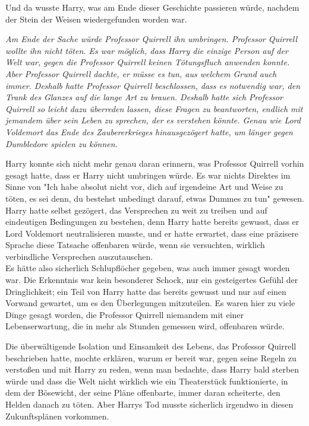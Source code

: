 {Und da wusste Harry, was am Ende dieser Geschichte passieren würde, nachdem der Stein der Weisen wiedergefunden worden war.

\emph{Am Ende der Sache würde Professor Quirrell ihn umbringen. Professor Quirrell wollte ihn nicht töten. Es war möglich, dass Harry die einzige Person auf der Welt war, gegen die Professor Quirrell keinen Tötungsfluch anwenden konnte. Aber Professor Quirrell dachte, er müsse es tun, aus welchem Grund auch immer. Deshalb hatte Professor Quirrell beschlossen, dass es notwendig war, den Trank des Glanzes auf die lange Art zu brauen. Deshalb hatte sich Professor Quirrell so leicht dazu überreden lassen, diese Fragen zu beantworten, endlich mit jemandem über sein Leben zu sprechen, der es verstehen könnte. Genau wie Lord Voldemort das Ende des Zaubererkrieges hinausgezögert hatte, um länger gegen Dumbledore spielen zu können.}

Harry konnte sich nicht mehr genau daran erinnern, was Professor Quirrell vorhin gesagt hatte, dass er Harry nicht umbringen würde. Es war nichts Direktes im Sinne von "Ich habe absolut nicht vor, dich auf irgendeine Art und Weise zu töten, es sei denn, du bestehst unbedingt darauf, etwas Dummes zu tun" gewesen. Harry hatte selbst gezögert, das Versprechen zu weit zu treiben und auf eindeutigen Bedingungen zu bestehen, denn Harry hatte bereits gewusst, dass er Lord Voldemort neutralisieren musste, und er hatte erwartet, dass eine präzisere Sprache diese Tatsache offenbaren würde, wenn sie versuchten, wirklich verbindliche Versprechen auszutauschen.\\ Es hätte also sicherlich Schlupflöcher gegeben, was auch immer gesagt worden war. Die Erkenntnis war kein besonderer Schock, nur ein gesteigertes Gefühl der Dringlichkeit; ein Teil von Harry hatte das bereits gewusst und nur auf einen Vorwand gewartet, um es den Überlegungen mitzuteilen. Es waren hier zu viele Dinge gesagt worden, die Professor Quirrell niemandem mit einer Lebenserwartung, die in mehr als Stunden gemessen wird, offenbaren würde.

Die überwältigende Isolation und Einsamkeit des Lebens, das Professor Quirrell beschrieben hatte, mochte erklären, warum er bereit war, gegen seine Regeln zu verstoßen und mit Harry zu reden, wenn man bedachte, dass Harry bald sterben würde und dass die Welt nicht wirklich wie ein Theaterstück funktionierte, in dem der Bösewicht, der seine Pläne offenbarte, immer daran scheiterte, den Helden danach zu töten. Aber Harrys Tod musste sicherlich irgendwo in diesen Zukunftsplänen vorkommen.

}

